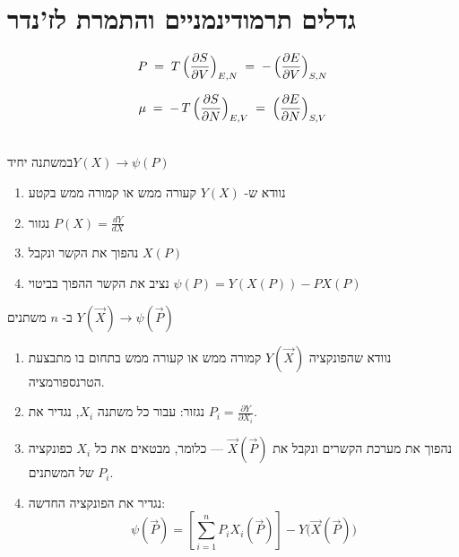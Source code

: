 \section{גדלים תרמודינמניים והתמרת לז'נדר}

\begin{cheatformula}[לחץ]
$$P \;=\; T \,\Bigl(\frac{\partial S}{\partial V}\Bigr)_{E,N} \;=\; -\,\Bigl(\frac{\partial E}{\partial V}\Bigr)_{S,N}$$
\end{cheatformula}

\begin{cheatformula}
$$\mu \;=\; -\,T \,\Bigl(\frac{\partial S}{\partial N}\Bigr)_{E,V} \;=\; \Bigl(\frac{\partial E}{\partial N}\Bigr)_{S,V}$$
\end{cheatformula}

\begin{cheatformula}\\
 במשתנה יחיד$Y(X) \to \psi(P)$
\begin{enumerate}
    \item נוודא ש- $Y(X)$ קעורה ממש או קמורה ממש בקטע
    \item נגזור $P(X) = \frac{dY}{dX}$
    \item נהפוך את הקשר ונקבל $X(P)$
    \item נציב את הקשר ההפוך בביטוי $\psi(P) = Y(X(P)) - PX(P)$
\end{enumerate}

ב- $n$ משתנים $Y(\vec{X}) \to \psi(\vec{P})$
\begin{enumerate}
    \item נוודא שהפונקציה $Y(\vec{X})$ קמורה ממש או קעורה ממש בתחום בו מתבצעת הטרנספורמציה.
    \item נגזור: עבור כל משתנה $X_i$, נגדיר את $P_i = \frac{\partial Y}{\partial X_i}$.
    \item נהפוך את מערכת הקשרים ונקבל את $\vec{X}(\vec{P})$ — כלומר, מבטאים את כל $X_i$ כפונקציה של המשתנים $P_i$.
    \item נגדיר את הפונקציה החדשה: \[
        \psi(\vec{P}) = \left[\sum_{i=1}^n P_i X_i(\vec{P})\right] - Y\big(\vec{X}(\vec{P})\big)
    \]
\end{enumerate}

\end{cheatformula}

